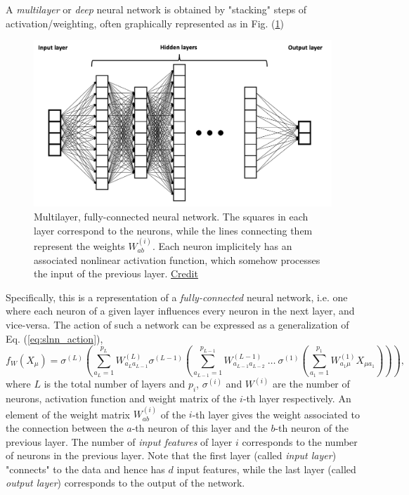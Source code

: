 \documentclass{article}
\begin{document}
A \emph{multilayer} or \emph{deep} neural network is obtained by "stacking" steps of activation/weighting, often graphically represented as in Fig. (\ref{fig:nn})
\begin{figure}[h]
    \centering
    \includegraphics[width=0.75\linewidth]{deep_nn}
    \caption{Multilayer, fully-connected neural network. The squares in each layer correspond to the neurons, while the lines connecting them represent the weights $W^{(i)}_{a b}$. Each neuron implicitely has an associated nonlinear activation function, which somehow processes the input of the previous layer. \href{https://commons.wikimedia.org/wiki/File:Example_of_a_deep_neural_network.png}{Credit}}
    \label{fig:nn}
\end{figure}
Specifically, this is a representation of a \emph{fully-connected} neural network, i.e. one where each neuron of a given layer influences every neuron in the next layer, and vice-versa. The action of such a network can be expressed as a generalization of Eq. (\ref{eq:slnn_action}),
\begin{equation}
    f_W(X_{\mu})
    =
    \sigma^{(L)}\left(
        \sum_{a_L=1}^{p_L} W^{(L)}_{a_L a_{L-1}}
        \sigma^{(L-1)}\left(
            \sum_{a_{L-1}=1}^{p_{L-1}} W^{(L-1)}_{a_{L-1} a_{L-2}}
            \ \dots \ 
            \sigma^{(1)}\left(
            \sum_{a_{1}=1}^{p_{1}} W^{(1)}_{a_{1} \mu} X_{\mu a_{1}}
            \right)
        \right)
    \right),
    \label{eq:mlnn_action}
\end{equation}
where $L$ is the total number of layers and $p_i$, $\sigma^{(i)}$ and $W^{(i)}$ are the number of neurons, activation function and weight matrix of the $i$-th layer respectively. An element of the weight matrix $W^{(i)}_{a b}$ of the $i$-th layer gives the weight associated to the connection between the $a$-th neuron of this layer and the $b$-th neuron of the previous layer. The number of \emph{input features} of layer $i$ corresponds to the number of neurons in the previous layer.
Note that the first layer (called \emph{input layer}) "connects" to the data and hence has $d$ input features, while the last layer (called \emph{output layer}) corresponds to the output of the network.
\end{document}
